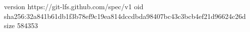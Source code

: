 version https://git-lfs.github.com/spec/v1
oid sha256:32a841b61db1f3b78ef9c19ea814dccdbda98407bc43c3bcb4ef21d96624c26d
size 584353
